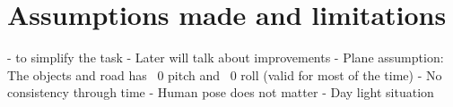 \chapter{Assumptions made and limitations}
\label{chap:assumptions}

- to simplify the task
- Later will talk about improvements
- Plane assumption: The objects and road has ~0 pitch and ~0 roll (valid for most of the time)
- No consistency through time
- Human pose does not matter
- Day light situation